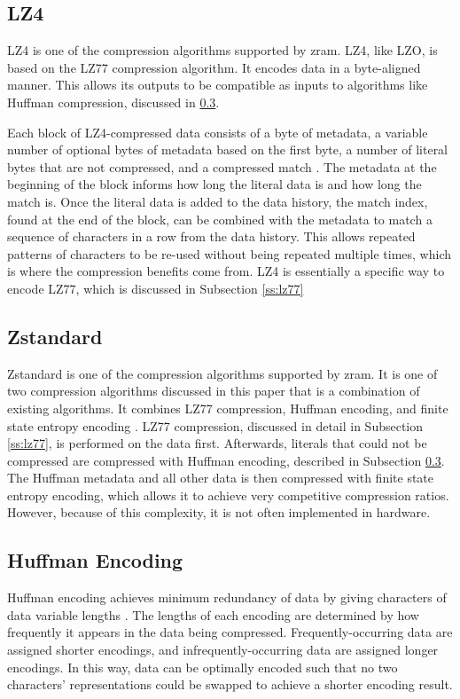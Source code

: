 \documentclass[doublespace,nopageskip]{VTthesis}
\begin{document}
\subsection{LZ4}\label{ss:lz4}
LZ4 is one of the compression algorithms supported by zram. LZ4, like LZO, is based on the LZ77 compression algorithm. It encodes data in a byte-aligned manner. This allows its outputs to be compatible as inputs to algorithms like Huffman compression, discussed in \ref{ss:huffman_encoding}.

Each block of LZ4-compressed data consists of a byte of metadata, a variable number of optional bytes of metadata based on the first byte, a number of literal bytes that are not compressed, and a compressed match \cite{lz4}. The metadata at the beginning of the block informs how long the literal data is and how long the match is. Once the literal data is added to the data history, the match index, found at the end of the block, can be combined with the metadata to match a sequence of characters in a row from the data history. This allows repeated patterns of characters to be re-used without being repeated multiple times, which is where the compression benefits come from. LZ4 is essentially a specific way to encode LZ77, which is discussed in Subsection \ref{ss:lz77}

\subsection{Zstandard}\label{ss:zstandard}
Zstandard is one of the compression algorithms supported by zram. It is one of two compression algorithms discussed in this paper that is a combination of existing algorithms. It combines LZ77 compression, Huffman encoding, and finite state entropy encoding \cite{zstd}. LZ77 compression, discussed in detail in Subsection \ref{ss:lz77}, is performed on the data first. Afterwards, literals that could not be compressed are compressed with Huffman encoding, described in Subsection \ref{ss:huffman_encoding}. The Huffman metadata and all other data is then compressed with finite state entropy encoding, which allows it to achieve very competitive compression ratios. However, because of this complexity, it is not often implemented in hardware. 

\subsection{Huffman Encoding}\label{ss:huffman_encoding}
Huffman encoding achieves minimum redundancy of data by giving characters of data variable lengths \cite{huffman}. The lengths of each encoding are determined by how frequently it appears in the data being compressed. Frequently-occurring data are assigned shorter encodings, and infrequently-occurring data are assigned longer encodings. In this way, data can be optimally encoded such that no two characters' representations could be swapped to achieve a shorter encoding result. 
\end{document}
